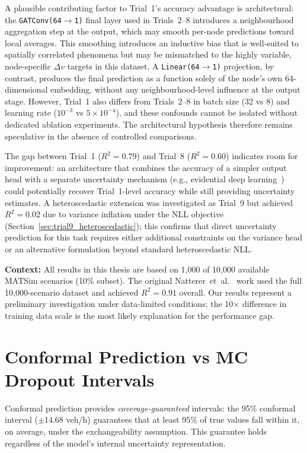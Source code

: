 A plausible contributing factor to Trial~1's accuracy advantage is architectural: the \texttt{GATConv(64$\to$1)} final layer used in Trials~2--8 introduces a neighbourhood aggregation step at the output, which may smooth per-node predictions toward local averages. This smoothing introduces an inductive bias that is well-suited to spatially correlated phenomena but may be mismatched to the highly variable, node-specific $\Delta v$ targets in this dataset. A \texttt{Linear(64$\to$1)} projection, by contrast, produces the final prediction as a function solely of the node's own 64-dimensional embedding, without any neighbourhood-level influence at the output stage. However, Trial~1 also differs from Trials~2--8 in batch size (32 vs 8) and learning rate ($10^{-3}$ vs $5 \times 10^{-4}$), and these confounds cannot be isolated without dedicated ablation experiments. The architectural hypothesis therefore remains speculative in the absence of controlled comparisons.

The gap between Trial~1 ($R^2 = 0.79$) and Trial~8 ($R^2 = 0.60$) indicates room for improvement: an architecture that combines the accuracy of a simpler output head with a separate uncertainty mechanism (e.g., evidential deep learning~\cite{amini2020deep}) could potentially recover Trial~1-level accuracy while still providing uncertainty estimates. A heteroscedastic extension was investigated as Trial~9 but achieved $R^2 = 0.02$ due to variance inflation under the NLL objective~\cite{seitzer2022pitfalls} (Section~\ref{sec:trial9_heteroscedastic}); this confirms that direct uncertainty prediction for this task requires either additional constraints on the variance head or an alternative formulation beyond standard heteroscedastic NLL.

\textbf{Context:} All results in this thesis are based on 1,000 of 10,000 available MATSim scenarios (10\% subset). The original Natterer~et~al.~\cite{natterer2025ml} work used the full 10,000-scenario dataset and achieved $R^2 = 0.91$ overall. Our results represent a preliminary investigation under data-limited conditions; the 10$\times$ difference in training data scale is the most likely explanation for the performance gap.

\section{Conformal Prediction vs MC Dropout Intervals}

Conformal prediction provides \emph{coverage-guaranteed} intervals: the 95\% conformal interval ($\pm$14.68 veh/h) guarantees that at least 95\% of true values fall within it, on average, under the exchangeability assumption. This guarantee holds regardless of the model's internal uncertainty representation.

